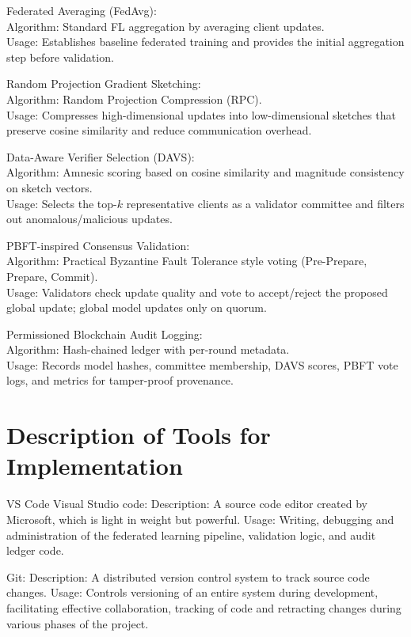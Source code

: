 Federated Averaging (FedAvg):\\
Algorithm: Standard FL aggregation by averaging client updates.\\
Usage: Establishes baseline federated training and provides the initial aggregation step before validation.

Random Projection Gradient Sketching:\\
Algorithm: Random Projection Compression (RPC).\\
Usage: Compresses high-dimensional updates into low-dimensional sketches that preserve cosine similarity and reduce communication overhead.

Data-Aware Verifier Selection (DAVS):\\
Algorithm: Amnesic scoring based on cosine similarity and magnitude consistency on sketch vectors.\\
Usage: Selects the top-\(k\) representative clients as a validator committee and filters out anomalous/malicious updates.

PBFT-inspired Consensus Validation:\\
Algorithm: Practical Byzantine Fault Tolerance style voting (Pre-Prepare, Prepare, Commit).\\
Usage: Validators check update quality and vote to accept/reject the proposed global update; global model updates only on quorum.

Permissioned Blockchain Audit Logging:\\
Algorithm: Hash-chained ledger with per-round metadata.\\
Usage: Records model hashes, committee membership, DAVS scores, PBFT vote logs, and metrics for tamper-proof provenance.

\section{Description of Tools for Implementation}

VS Code Visual Studio code:
Description: A source code editor created by Microsoft, which is light in weight but powerful.
Usage: Writing, debugging and administration of the federated learning pipeline, validation logic, and audit ledger code.

Git:
Description: A distributed version control system to track source code changes.
Usage: Controls versioning of an entire system during development, facilitating effective collaboration, tracking of code and retracting changes during various phases of the project.

